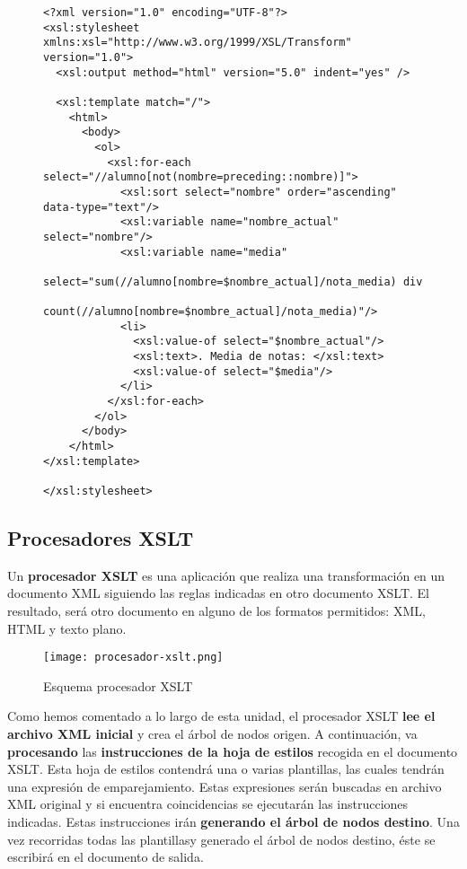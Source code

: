 \begin{figure}[H]
    \begin{tcolorbox}[sharp corners, colback=yellow!30, colframe=white!20]
        \scriptsize
\begin{verbatim}
<?xml version="1.0" encoding="UTF-8"?>
<xsl:stylesheet xmlns:xsl="http://www.w3.org/1999/XSL/Transform" version="1.0">
  <xsl:output method="html" version="5.0" indent="yes" />

  <xsl:template match="/">
    <html>
      <body>
        <ol>
          <xsl:for-each select="//alumno[not(nombre=preceding::nombre)]">
            <xsl:sort select="nombre" order="ascending" data-type="text"/>
            <xsl:variable name="nombre_actual" select="nombre"/>
            <xsl:variable name="media"
            select="sum(//alumno[nombre=$nombre_actual]/nota_media) div
            count(//alumno[nombre=$nombre_actual]/nota_media)"/>
            <li>
              <xsl:value-of select="$nombre_actual"/>
              <xsl:text>. Media de notas: </xsl:text>
              <xsl:value-of select="$media"/>
            </li>
          </xsl:for-each>
        </ol>
      </body>
    </html>
</xsl:template>

</xsl:stylesheet>
\end{verbatim}
    \end{tcolorbox}
\end{figure}

\subsection{Procesadores XSLT}
Un \textbf{procesador XSLT} es una aplicación que realiza una transformación en un documento XML siguiendo las reglas indicadas en otro documento XSLT. El resultado, será otro documento en alguno de los formatos permitidos: XML, HTML y texto plano.

    \begin{figure}[H]
    \centering
    \texttt{[image: procesador-xslt.png]}
    \caption{Esquema procesador XSLT}
\end{figure}

Como hemos comentado a lo largo de esta unidad, el procesador XSLT \textbf{lee el archivo XML inicial} y crea el árbol de nodos origen. A continuación, va \textbf{procesando} las \textbf{instrucciones de la hoja de estilos} recogida en el documento XSLT. Esta hoja de estilos contendrá una o varias plantillas, las cuales tendrán una expresión de emparejamiento. Estas expresiones serán buscadas en archivo XML original y si encuentra coincidencias se ejecutarán las instrucciones indicadas. Estas instrucciones irán \textbf{generando el árbol de nodos destino}. Una vez recorridas todas las plantillasy generado el árbol de nodos destino, éste se escribirá en el documento de salida.

